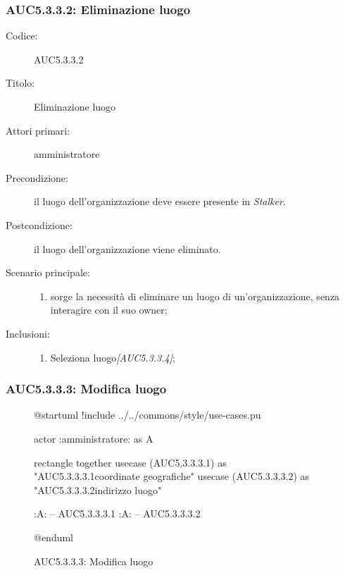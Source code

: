 \documentclass[../../../analisi-dei-requisiti.tex]{subfiles}
\begin{document}
\subsubsection{AUC5.3.3.2: Eliminazione luogo}%
\label{subs:AUC5.3.3.2}
\begin{description}
  \item[Codice:] AUC5.3.3.2
  \item[Titolo:] Eliminazione luogo
  \item[Attori primari:] amministratore
  \item[Precondizione:] il luogo dell'organizzazione deve essere presente in \emph{Stalker}.
  \item[Postcondizione:] il luogo dell'organizzazione viene eliminato.
  \item[Scenario principale:]
  \begin{enumerate}
    \item sorge la necessità di eliminare un luogo di un'organizzazione, senza interagire con il suo owner;
  \end{enumerate}
  \item[Inclusioni:]
  \begin{enumerate}
    \item Seleziona luogo\emph{[AUC5.3.3.4]};
  \end{enumerate}
\end{description}

\subsubsection{AUC5.3.3.3: Modifica luogo}%
\label{subs:AUC5.3.3.3}

\begin{figure}[H]
  \centering
  \begin{plantuml}
  @startuml
  !include ../../commons/style/use-cases.pu

  actor :amministratore: as A

  rectangle {
    together {
      usecase (AUC5.3.3.3.1) as "AUC5.3.3.3.1\nModifica coordinate geografiche"
      usecase (AUC5.3.3.3.2) as "AUC5.3.3.3.2\nModifica indirizzo luogo"
    }
  }

  :A: -- AUC5.3.3.3.1
  :A: -- AUC5.3.3.3.2

  @enduml
  \end{plantuml}
  \caption{AUC5.3.3.3: Modifica luogo}
  \label{fig:AUC5_3_3_3}
\end{figure}
\end{document}
